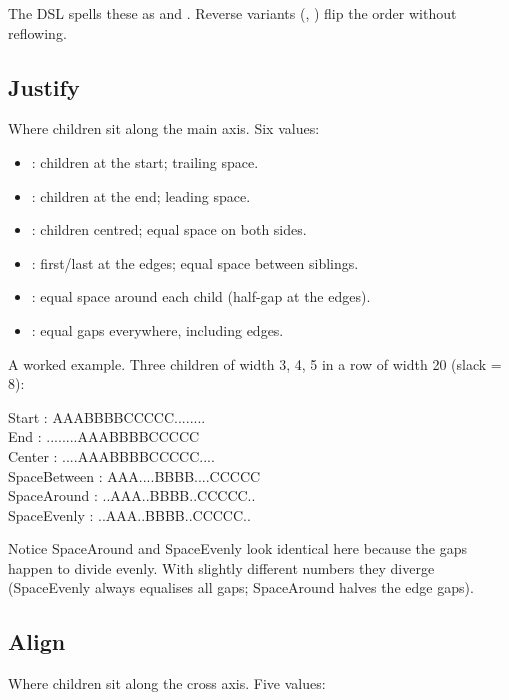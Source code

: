 The DSL spells these as  and .
Reverse variants (, ) flip
the order without reflowing.

\subsection*{Justify}

Where children sit along the main axis. Six values:

\begin{itemize}[leftmargin=*]
  \item {}: children at the start; trailing space.
  \item {}: children at the end; leading space.
  \item {}: children centred; equal space on both sides.
  \item {}: first/last at the edges; equal space
    between siblings.
  \item {}: equal space around each child
    (half-gap at the edges).
  \item {}: equal gaps everywhere, including
    edges.
\end{itemize}

A worked example. Three children of width 3, 4, 5 in a row of
width 20 (slack = 8):

\begin{terminalbox}
Start        : AAABBBBCCCCC........\\
End          : ........AAABBBBCCCCC\\
Center       : ....AAABBBBCCCCC....\\
SpaceBetween : AAA....BBBB....CCCCC\\
SpaceAround  : ..AAA..BBBB..CCCCC..\\
SpaceEvenly  : ..AAA..BBBB..CCCCC..
\end{terminalbox}

Notice SpaceAround and SpaceEvenly look identical here because
the gaps happen to divide evenly. With slightly different numbers
they diverge (SpaceEvenly always equalises all gaps; SpaceAround
halves the edge gaps).

\subsection*{Align}

Where children sit along the cross axis. Five values:

